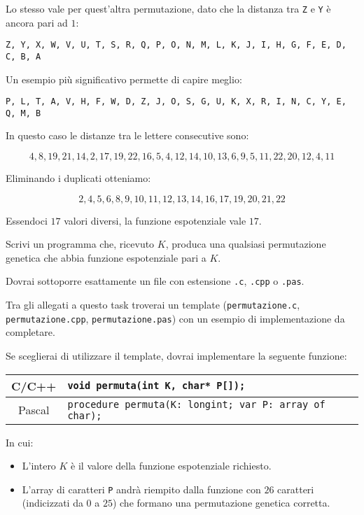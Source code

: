 Lo stesso vale per quest'altra permutazione, dato che la distanza tra \texttt{Z} e \texttt{Y} è ancora pari ad $1$:

\begin{center}
\texttt{Z, Y, X, W, V, U, T, S, R, Q, P, O, N, M, L, K, J, I, H, G, F, E, D, C, B, A}
\end{center}

Un esempio più significativo permette di capire meglio:

\begin{center}
\texttt{P, L, T, A, V, H, F, W, D, Z, J, O, S, G, U, K, X, R, I, N, C, Y, E, Q, M, B}
\end{center}

In questo caso le distanze tra le lettere consecutive sono:

$$4, 8, 19, 21, 14, 2, 17, 19, 22, 16, 5, 4, 12, 14, 10, 13, 6, 9, 5, 11, 22, 20, 12, 4, 11$$

Eliminando i duplicati otteniamo:

$$2, 4, 5, 6, 8, 9, 10, 11, 12, 13, 14, 16, 17, 19, 20, 21, 22$$

Essendoci $17$ valori diversi, la funzione espotenziale vale $17$.

Scrivi un programma che, ricevuto $K$, produca una qualsiasi permutazione genetica che abbia funzione espotenziale pari a $K$.

\Implementation
Dovrai sottoporre esattamente un file con estensione \texttt{.c}, \texttt{.cpp} o \texttt{.pas}.

\begin{warning}
Tra gli allegati a questo task troverai un template (\texttt{permutazione.c}, \texttt{permutazione.cpp}, \texttt{permutazione.pas}) con un esempio di implementazione da completare.
\end{warning}

Se sceglierai di utilizzare il template, dovrai implementare la seguente funzione:
\begin{center}\begin{tabularx}{\textwidth}{|c|X|}
\hline
C/C++  & \verb|void permuta(int K, char* P[]);|\\
\hline
Pascal & \verb|procedure permuta(K: longint; var P: array of char);|\\
\hline
\end{tabularx}\end{center}
In cui:
\begin{itemize}[nolistsep]
  \item L'intero $K$ è il valore della funzione espotenziale richiesto.
  \item L'array di caratteri \texttt{P} andrà riempito dalla funzione con $26$ caratteri (indicizzati da $0$ a $25$) che formano una permutazione genetica corretta.
\end{itemize}

